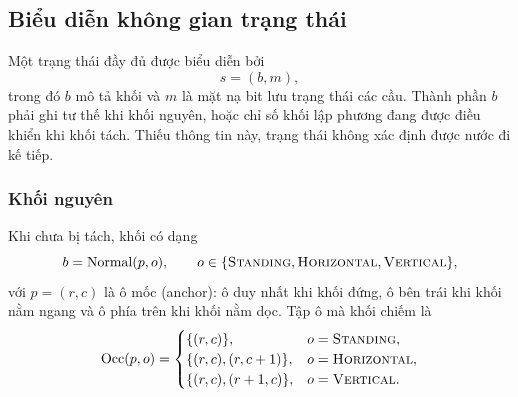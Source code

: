 \subsection{Biểu diễn không gian trạng thái}

Một trạng thái đầy đủ được biểu diễn bởi
\begin{equation}
s=(b,m),
\end{equation}
trong đó $b$ mô tả khối và $m$ là mặt nạ bit lưu trạng thái các cầu. Thành phần
$b$ phải ghi tư thế khi khối nguyên, hoặc chỉ số khối lập phương đang được điều
khiển khi khối tách. Thiếu thông tin này, trạng thái không xác định được nước
đi kế tiếp.

\subsubsection{Khối nguyên}

Khi chưa bị tách, khối có dạng
\begin{equation}
b=\operatorname{Normal}(p,o),\qquad
o\in\{\textsc{Standing},\textsc{Horizontal},\textsc{Vertical}\},
\end{equation}
với $p=(r,c)$ là ô mốc (anchor): ô duy nhất khi khối đứng, ô bên trái khi khối
nằm ngang và ô phía trên khi khối nằm dọc. Tập ô mà khối chiếm là
\begin{equation}
\operatorname{Occ}(p,o)=
\begin{cases}
\{(r,c)\}, & o=\textsc{Standing},\\
\{(r,c),(r,c+1)\}, & o=\textsc{Horizontal},\\
\{(r,c),(r+1,c)\}, & o=\textsc{Vertical}.
\end{cases}
\end{equation}

